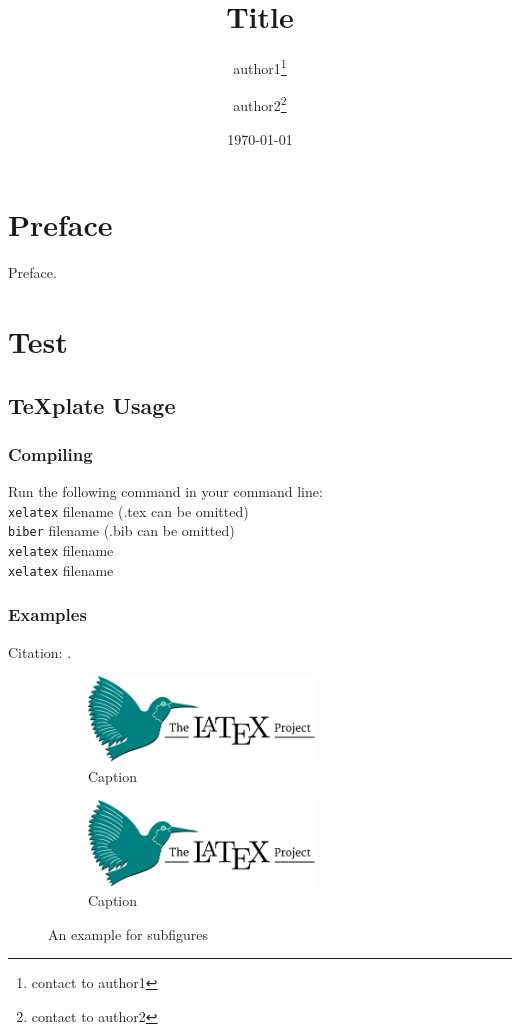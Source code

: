 \documentclass[openany]{book}
\title{Title}
\author{ author1\thanks{contact to author1}
	\and
		author2\thanks{contact to author2}}
\date{\today} %
\begin{document}
\maketitle %
\frontmatter
\chapter{Preface}
Preface.

\tableofcontents

\mainmatter
\chapter{Test}
\section{\texorpdfstring{\TeX{}plate Usage}{TeXplate Usage}}
\subsection{Compiling}

Run the following command in your command line:\\[0pt]
\verb|xelatex| filename (.tex can be omitted)\\
\verb|biber| filename (.bib can be omitted)\\
\verb|xelatex| filename\\
\verb|xelatex| filename

\subsection{Examples}

Citation: \cite{Knuth}.

\begin{figure}[h] %
\centering
\begin{subfigure}{.5\textwidth}
	\centering
	\includegraphics[width=6cm]{latex-project-logo.pdf}
	\caption{Caption}
	\label{subfigure1}
\end{subfigure}%
\begin{subfigure}{.5\textwidth}
	\centering
	\includegraphics[width=6cm]{latex-project-logo.pdf}
	\caption{Caption}
	\label{subfigure2}
\end{subfigure}
\caption{An example for subfigures}
\end{figure}
\end{document}
